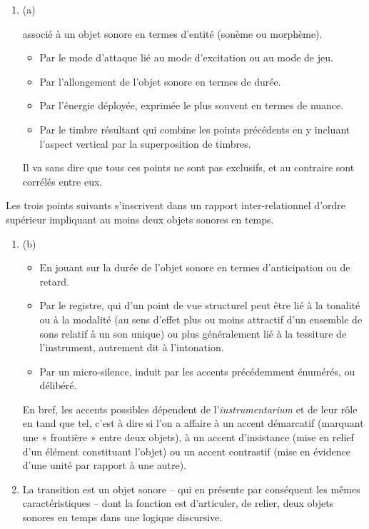 \documentclass{article}
\newcommand{\myuline}[1]{%
  \uline{\phantom{#1}}%
  \llap{{#1}}%
}
\begin{document}
\begin{enumerate}
\item (a) \myuline{Accent} 

associé à un objet sonore en termes d’entité (sonème ou morphème).

\begin{itemize}
\item Par le mode d’attaque lié au mode d’excitation ou au mode de jeu.
\item Par l'allongement de l'objet sonore en termes de durée.
\item Par l’énergie déployée, exprimée le plus souvent en termes de nuance. 
\item Par le timbre résultant qui combine les points précédents en y incluant l'aspect vertical par la superposition de timbres.
\end{itemize}
Il va sans dire que tous ces points ne sont pas exclusifs, et au contraire sont corrélés entre eux.
 \end{enumerate}
Les trois points suivants s’inscrivent dans un rapport inter-relationnel d’ordre supérieur impliquant au moins deux objets sonores en temps.
\begin{enumerate}%
\item (b) \myuline{Accent}
\begin{itemize}
\item En jouant sur la durée de l'objet sonore en termes d'anticipation ou de retard.
\item Par le registre, qui d’un point de vue structurel peut être lié à la tonalité ou à la modalité (au sens d’effet plus ou moins attractif d’un ensemble de sons relatif à un son unique) ou plus généralement lié à la tessiture de l'instrument, autrement dit à l’intonation.
\item Par un micro-silence, induit par les accents précédemment énumérés, ou délibéré.
\end{itemize}

En bref, les accents possibles dépendent de l'\textit{instrumentarium} et de leur rôle en tand que tel, c’est à dire si l’on a affaire à un accent démarcatif (marquant une « frontière » entre deux objets), à un accent d’insistance (mise en relief d'un élément constituant l'objet) ou un accent contrastif (mise en évidence d'une unité par rapport à une autre).

\item \myuline{Transition}

La transition est un objet sonore -- qui en présente par conséquent les mêmes caractéristiques --  dont la fonction est d'articuler, de relier, deux objets sonores en temps dans une logique discursive.

 \end{enumerate}
\end{document}
